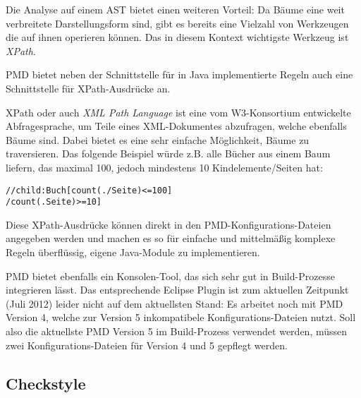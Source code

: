 Die Analyse auf einem AST bietet einen weiteren Vorteil: Da Bäume eine weit verbreitete Darstellungsform sind, gibt es bereits eine Vielzahl von Werkzeugen die auf ihnen operieren können. Das in diesem Kontext wichtigste Werkzeug ist \textit{XPath}.

PMD bietet neben der Schnittstelle für in Java implementierte Regeln auch eine Schnittstelle für XPath-Ausdrücke an.

XPath oder auch \textit{XML Path Language} ist eine vom W3-Konsortium entwickelte Abfragesprache, um Teile eines XML-Dokumentes abzufragen, welche ebenfalls Bäume sind. Dabei bietet es eine sehr einfache Möglichkeit, Bäume zu traversieren. Das folgende Beispiel würde z.B. alle Bücher aus einem Baum liefern, das maximal 100, jedoch mindestens 10 Kindelemente/Seiten hat:


\begin{lstlisting}
//child:Buch[count(./Seite)<=100]
/count(.Seite)>=10]
\end{lstlisting}

Diese XPath-Ausdrücke können direkt in den PMD-Konfigurations-Dateien angegeben werden und machen es so für einfache und mittelmäßig komplexe Regeln überflüssig, eigene Java-Module zu implementieren.

PMD bietet ebenfalls ein Konsolen-Tool, das sich sehr gut in Build-Prozesse integrieren lässt. Das entsprechende Eclipse Plugin ist zum aktuellen Zeitpunkt (Juli 2012) leider nicht auf dem aktuellsten Stand: Es arbeitet noch mit PMD Version 4, welche zur Version 5 inkompatibele Konfigurations-Dateien nutzt. Soll also die aktuellste PMD Version 5 im Build-Prozess verwendet werden, müssen zwei Konfigurations-Dateien für Version 4 und 5 gepflegt werden.


\subsection{Checkstyle}

